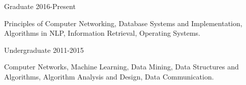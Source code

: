 
\begin{cventries}
  \cventry
    {Graduate} %
    {} %
    {} %
    {2016-Present} %
    {
      \begin{cvitems} %
        \item {Principles of Computer Networking, Database Systems and Implementation, Algorithms in NLP, Information Retrieval, Operating Systems.}
      \end{cvitems}
    }
    {}
  
  \cventry
    {Undergraduate} %
    {} %
    {} %
    {2011-2015} %
    {
      \begin{cvitems} %
        \item {Computer Networks, Machine Learning, Data Mining, Data Structures and Algorithms, Algorithm Analysis and Design, Data Communication.}
      \end{cvitems}
    }
    {}

 \vspace*{-3mm}
    
\end{cventries}